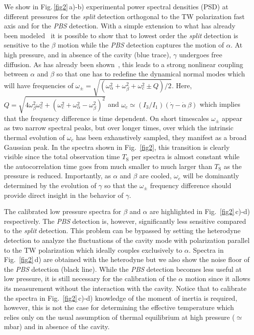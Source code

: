 \documentclass[aps,pra,twocolumn,nopacs,superscriptaddress,groupedaddress]{revtex4}
\begin{document}
We show in Fig.\,\ref{fig2}\,a)-b) experimental power spectral densities (PSD) at different pressures for the \textit{split} detection orthogonal to the TW polarization fast axis and for the \textit{PBS} detection. With a simple extension to what has already been modeled~\cite{Robicheaux2019_PRA,supp} it is possible to show that to lowest order the \textit{split} detection is sensitive to the $\beta$ motion while the \textit{PBS} detection captures the motion of $\alpha$. At high pressure, and in absence of the cavity (blue trace), $\gamma$ undergoes free diffusion. As has already been shown~\cite{tongcangli_5D,Robicheaux2019_PRA}, this leads to a strong nonlinear coupling between $\alpha$ and $\beta$ so that one has to redefine the dynamical normal modes which will have frequencies of $\omega_{\pm}=\sqrt{(\omega_{\alpha}^2+ \omega_{\beta}^2+\omega_{c}^2\pm Q)/2}$. Here, $Q=\sqrt{4 \omega_{\beta}^2\omega_c^2+(\omega_c^2+\omega_{\alpha}^2- \omega_{\beta}^2)^2}$ and $\omega_c\simeq(I_3/I_1)(\dot{\gamma}-\dot{\alpha}\,\beta)$ which implies that the frequency difference is time dependent. On short timescales $\omega_{\pm}$ appear as two narrow spectral peaks, but over longer times, over which the intrinsic thermal evolution of $\omega_c$ has been exhaustively sampled, they manifest as a broad Gaussian peak. In the spectra shown in Fig.~\ref{fig2}, this transition is clearly visible since the total observation time $T_{\text{S}}$ per spectra is almost constant while the autocorrelation time goes from much smaller to much larger than $T_{\text{S}}$ as the pressure is reduced. Importantly, as $\alpha$ and $\beta$ are cooled, $\omega_c$ will be dominantly determined by the evolution of $\gamma$ so that the $\omega_{\pm}$ frequency difference should provide direct insight in the behavior of $\gamma$. %

The calibrated low pressure spectra for $\beta$ and $\alpha$ are highlighted in Fig.~\ref{fig2}\,c)-d) respectively. The \textit{PBS} detection is, however, significantly less sensitive compared to the \textit{split} detection. This problem can be bypassed by setting the heterodyne detection to analyze the fluctuations of the cavity mode with polarization parallel to the TW polarization which ideally couples exclusively to $\alpha$. Spectra in Fig.~\ref{fig2}\,d) are obtained with the heterodyne but we also show the noise floor of the \textit{PBS} detection (black line). While the \textit{PBS} detection becomes less useful at low pressure, it is still necessary for the calibration of the $\alpha$ motion since it allows its measurement without the interaction with the cavity. Notice that to calibrate the spectra in Fig.~\ref{fig2}\,c)-d) knowledge of the moment of inertia is required, however, this is not the case for determining the effective temperature which relies only on the usual assumption of thermal equilibrium at high pressure ($\simeq$mbar) and in absence of the cavity.
\end{document}
